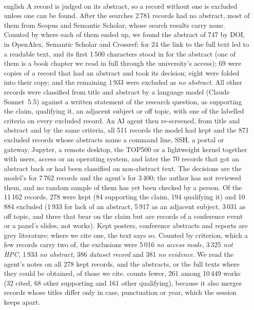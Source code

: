 \paragraph{} %
\begin{onlyin}{english} %
A record is judged on its abstract, so a record without one is excluded
unless one can be found.  After the searches 2\,781 records had no
abstract, most of them from Scopus and Semantic Scholar, whose search
results carry none.  Counted by where each of them ended up, we found
the abstract of 747 by DOI, in OpenAlex, Semantic Scholar and Crossref;
for 24 the link to the full text led to a readable text, and its first
1\,500 characters stood in for the abstract (one of them is a book
chapter we read in full through the university's access); 69 were
copies of a record that had an abstract and took its decision; eight
were folded into their copy; and the remaining 1\,933 were excluded as
\emph{no abstract}.  All other records were classified from title and
abstract by a language model (Claude Sonnet~5.5) against a written
statement of the research question, as supporting the claim, qualifying
it, an adjacent subject or off topic, with one of the labelled criteria
on every excluded record.  An AI agent then re-screened, from title and
abstract and by the same criteria, all 511 records the model had kept
and the 871 excluded records whose abstracts name a command line, SSH, a
portal or gateway, Jupyter, a remote desktop, the TOP500 or a lightweight
kernel together with users, access or an operating system, and later the
70 records that got an abstract back or had been classified on
non-abstract text.  The decisions are the model's for 7\,762 records and
the agent's for 3\,400; the author has not reviewed them, and no random
sample of them has yet been checked by a person.  Of the 11\,162
records, 278 were kept (84 supporting the claim, 194 qualifying it) and
10\,884 excluded (1\,933 for lack of an abstract, 5\,917 as an adjacent
subject, 3\,031 as off topic, and three that bear on the claim but are
records of a conference event or a panel's slides, not works).  Kept
posters, conference abstracts and reports are grey literature; where we
cite one, the text says so.  Counted by criterion, which a few records
carry two of, the exclusions were 5\,016 \emph{no access mode},
3\,325 \emph{not HPC}, 1\,933 \emph{no abstract}, 386 \emph{dataset
record} and 381 \emph{no evidence}.  We read the agent's notes on all
278 kept records, and the abstracts, or the full texts where they could
be obtained, of those we cite.   counts
fewer, 261 among 10\,449 works (32 cited, 68 other supporting and 161
other qualifying), because it also merges records whose titles differ only in
case,
punctuation or year, which the session keeps apart.
\end{onlyin}
